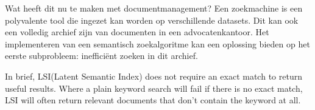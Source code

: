 Wat heeft dit nu te maken met documentmanagement? Een zoekmachine is een polyvalente tool die ingezet kan worden op verschillende datasets. Dit kan ook een volledig archief zijn van 
documenten in een advocatenkantoor. Het implementeren van een semantisch zoekalgoritme kan een oplossing bieden op het eerste subprobleem: inefficiënt zoeken in dit archief. 

\begin{displayquote}
	In brief, LSI(Latent Semantic Index) does not require an exact match to return useful results. 
	Where a plain keyword search will fail if there is no exact match, 
	LSI will often return relevant documents that don’t contain the keyword at all. \autocite{Medium}
\end{displayquote}

